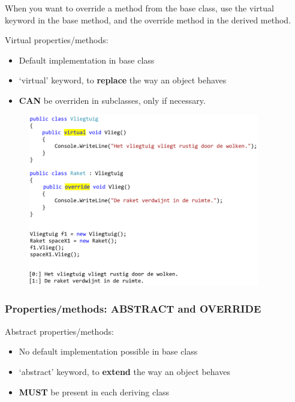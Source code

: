 \documentclass{article}
\newcommand{\bold}[1]{\textbf{#1}}
\begin{document}
When you want to override a method from the base class, 
use the virtual keyword in the base method,
and the override method in the derived method.

Virtual properties/methods:
\begin{itemize}
    \item Default implementation in base class
    \item `virtual' keyword, to \bold{replace} the way an object behaves
    \item \bold{CAN} be overriden in subclasses, only if necessary.
\end{itemize}

\begin{figure}[H]
    \centering
    \includegraphics[width=0.9\textwidth]{inheritance-override.png}
    \caption{}
\end{figure}


\subsubsection{Properties/methods: ABSTRACT and OVERRIDE}

Abstract properties/methods:

\begin{itemize}
    \item No default implementation possible in base class
    \item `abstract' keyword, to \bold{extend} the way an object behaves
    \item \bold{MUST} be present in each deriving class
\end{itemize}
\end{document}
